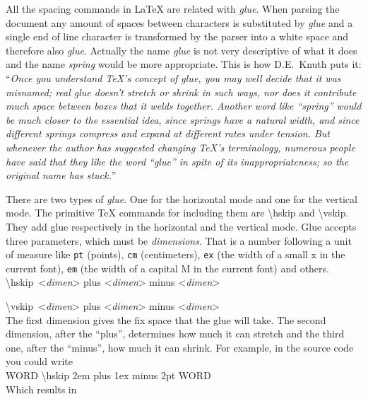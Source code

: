 \documentclass[a4paper]{article}
\newcommand{\bs}[1]{{\rmfamily\color{blue}\textbackslash{}#1}}
\begin{document}
All the spacing commands in \LaTeX{} are related with \emph{glue}. When parsing the document any amount of spaces between characters is substituted by \emph{glue} and a single end of line character is transformed by the parser into a white space and therefore also \emph{glue}. Actually the name \emph{glue} is not very descriptive of what it does and the name \emph{spring} would be more appropriate. This is how D.E.~Knuth puts it: ``\emph{Once you understand \TeX{}’s concept of glue, you may well decide that it was misnamed; real glue doesn’t stretch or shrink in such ways, nor does it contribute much space between boxes that it welds together. Another word like ``spring'' would be much closer to the essential idea, since springs have a natural width, and since different springs compress and expand at different rates under tension. But whenever the author has suggested changing \TeX{}’s terminology, numerous people have said that they like the word “glue” in spite of its inappropriateness; so the original name has stuck.}'' 

There are two types of \emph{glue}. One for the horizontal mode and one for the vertical mode. The primitive \TeX{} commands for including them are \bs{hskip} and \bs{vskip}. They add glue respectively in the horizontal and the vertical mode. Glue accepts three parameters, which must be \emph{dimensions}. That is a number following a unit of measure like \texttt{pt} (points), \texttt{cm} (centimeters), \texttt{ex} (the width of a small x in the current font), \texttt{em} (the width of a capital M in the current font) and others.\\

\bs{hskip}{\ttfamily~<\textsf{\itshape dimen}> plus <\textsf{\itshape dimen}> minus <\textsf{\itshape dimen}>}

\bs{vskip}{\ttfamily~<\textsf{\itshape dimen}> plus <\textsf{\itshape dimen}> minus <\textsf{\itshape dimen}>}\\

\noindent The first dimension gives the fix space that the glue will take. The second dimension, after the ``plus'', determines how much it can stretch and the third one, after the ``minus'', how much it can shrink. For example, in the source code you could write\\

{\ttfamily WORD \bs{hskip} 2em plus 1ex minus 2pt WORD}\\

Which results in\\
\end{document}
